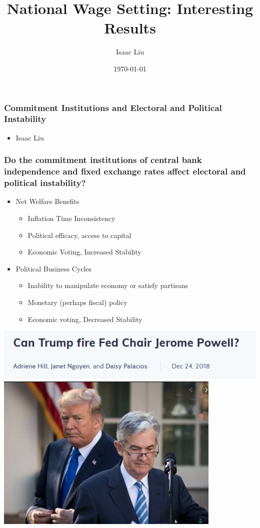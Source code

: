 \documentclass[]{beamer}
\title{National Wage Setting: Interesting Results}
\author{Isaac Liu}
\date{\today}
\begin{document}
\begin{frame}
    \frametitle{Commitment Institutions and Electoral and Political Instability}
    \begin{itemize}
        \item Isaac Liu
    \end{itemize}
\end{frame}

\begin{frame}
\frametitle{Do the commitment institutions of central bank independence and fixed exchange rates affect electoral and political instability?}
\begin{itemize}
\item Net Welfare Benefits
\begin{itemize}
\item Inflation Time Inconsistency
\item Political efficacy, access to capital
\item Economic Voting, Increased Stability
\end{itemize}
\item Political Business Cycles
\begin{itemize}
\item Inability to manipulate economy or satisfy partisans
\item Monetary (perhaps fiscal) policy
\item Economic voting, Decreased Stability
\end{itemize}
\end{itemize}
\includegraphics{img0000.png}
\includegraphics{img0001.png}
\end{frame}
\end{document}
